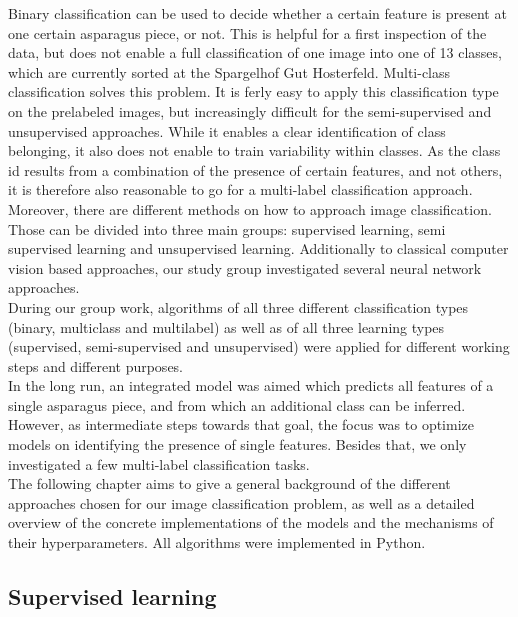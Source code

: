 Binary classification can be used to decide whether a certain feature is present at one certain asparagus piece, or not. This is helpful for a first inspection of the data, but does not enable a full classification of one image into one of 13 classes, which are currently sorted at the Spargelhof Gut Hosterfeld. Multi-class classification solves this problem. It is ferly easy to apply this classification type on the prelabeled images, but increasingly difficult for the semi-supervised and unsupervised approaches. While it enables a clear identification of class belonging, it also does not enable to train variability within classes. As the class id results from a combination of the presence of certain features, and not others, it is therefore also reasonable to go for a multi-label classification approach. \\

Moreover, there are different methods on how to approach image classification. Those can be divided into three main groups: supervised learning, semi supervised learning and unsupervised learning. Additionally to classical computer vision based approaches, our study group investigated several neural network approaches. \\

During our group work, algorithms of all three different classification types (binary, multiclass and multilabel) as well as of all three learning types (supervised, semi-supervised and unsupervised) were applied for different working steps and different purposes. \\

In the long run, an integrated model was aimed which predicts all features of a single asparagus piece, and from which an additional class can be inferred. However, as intermediate steps towards that goal, the focus was to optimize models on identifying the presence of single features. Besides that, we only investigated a few multi-label classification tasks. \\

The following chapter aims to give a general background of the different approaches chosen for our image classification problem, as well as a detailed overview of the concrete implementations of the models and the mechanisms of their hyperparameters. 
All algorithms were implemented in Python.  \\



\subsection{Supervised learning}

